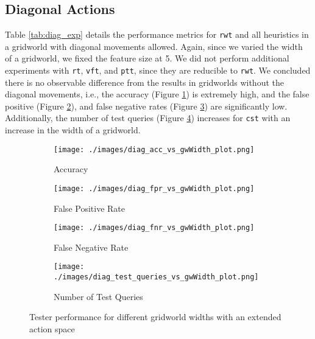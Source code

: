 \subsection{Diagonal Actions}
Table \ref{tab:diag_exp} details the performance metrics for \texttt{rwt} and all heuristics in a gridworld with diagonal movements allowed. Again, since we varied the width of a gridworld, we fixed the feature size at 5. We did not perform additional experiments with \texttt{rt}, \texttt{vft}, and \texttt{ptt}, since they are reducible to \texttt{rwt}. We concluded there is no observable difference from the results in gridworlds without the diagonal movements, i.e., the accuracy (Figure \ref{fig:diag_acc_vs_gwWidth_plot}) is extremely high, and the false positive (Figure \ref{fig:diag_fpr_vs_gwWidth_plot}), and false negative rates (Figure \ref{fig:diag_fnr_vs_gwWidth_plot}) are significantly low. Additionally, the number of test queries (Figure \ref{fig:diag_test_queries_vs_gwWidth_plot}) increases for \texttt{cst} with an increase in the width of a gridworld.

\begin{figure}[!ht]
     \centering
     \begin{subfigure}[!ht]{0.4\textwidth}
         \centering
         \texttt{[image: ./images/diag\_acc\_vs\_gwWidth\_plot.png]}
         \caption{Accuracy}
         \label{fig:diag_acc_vs_gwWidth_plot}
     \end{subfigure}
    \hspace{5mm}
     \begin{subfigure}[!ht]{0.4\textwidth}
         \centering
         \texttt{[image: ./images/diag\_fpr\_vs\_gwWidth\_plot.png]}
         \caption{False Positive Rate}
         \label{fig:diag_fpr_vs_gwWidth_plot}
     \end{subfigure}
     \hspace{5mm}
     \begin{subfigure}[!ht]{0.4\textwidth}
         \centering
         \texttt{[image: ./images/diag\_fnr\_vs\_gwWidth\_plot.png]}
         \caption{False Negative Rate}
         \label{fig:diag_fnr_vs_gwWidth_plot}
     \end{subfigure}
     \hspace{5mm}
    \begin{subfigure}[!ht]{0.4\textwidth}
         \centering
         \texttt{[image: ./images/diag\_test\_queries\_vs\_gwWidth\_plot.png]}
         \caption{Number of Test Queries}
         \label{fig:diag_test_queries_vs_gwWidth_plot}
     \end{subfigure}
    \caption{Tester performance for different gridworld widths with an extended action space}
    \label{fig:diag_experiments_appendix}
\end{figure}


